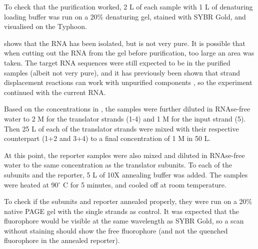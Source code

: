 To check that the purification worked, 2 \si{\micro}L of each sample with 1 \si{\micro}L of denaturing loading buffer was run on a 20\% denaturing gel, stained with SYBR Gold, and visualised on the Typhoon.

 shows that the RNA has been isolated, but is not very pure. It is possible that when cutting out the RNA from the gel before purification, too large an area was taken. The target RNA sequences were still expected to be in the purified samples (albeit not very pure), and it has previously been shown that strand displacement reactions can work with unpurified components \cite{Thubagere2017}, so the experiment continued with the current RNA.

Based on the concentrations in , the samples were further diluted in RNAse-free water to 2 \si{\micro}M for the translator strands (1-4) and 1 \si{\micro}M for the input strand (5). Then 25 \si{\micro}L of each of the translator strands were mixed with their respective counterpart (1+2 and 3+4) to a final concentration of 1 \si{\micro}M in 50 \si{\micro}L.

At this point, the reporter samples were also mixed and diluted in RNAse-free water to the same concentration as the translator subunits. To each of the subunits and the reporter, 5 \si{\micro}L of 10X annealing buffer was added. The samples were heated at 90$^\circ$ C for 5 minutes, and cooled off at room temperature.

To check if the subunits and reporter annealed properly, they were run on a 20\% native PAGE gel with the single strands as control. It was expected that the fluorophore would be visible at the same wavelength as SYBR Gold, so a scan without staining should show the free fluorophore (and not the quenched fluorophore in the annealed reporter).

